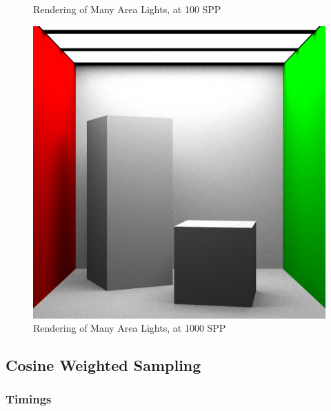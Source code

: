 \documentclass[a4paper]{myarticle}
\begin{document}
\begin{figure}[H]
\begin{minipage}[t]{.3\textwidth}
      \caption{Rendering of Many Area Lights, at 100 SPP}
  \end{minipage}
  \hfill
  \begin{minipage}[t]{.3\textwidth}
      \centering
      \includegraphics[width=\textwidth]{q3/many_0_1000.png}
      \caption{Rendering of Many Area Lights, at 1000 SPP}
  \end{minipage}
\end{figure}

\subsection{Cosine Weighted Sampling}

\subsubsection{Timings}
\end{document}

